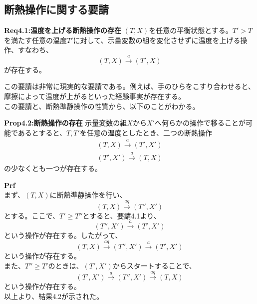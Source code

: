 \documentclass[a4paper,11pt]{jsarticle}
\begin{document}
\subsection{断熱操作に関する要請}
\begin{itembox}[l]{\textbf{Req4.1:温度を上げる断熱操作の存在}}
    $(T,X)$を任意の平衡状態とする。$T'>T$を満たす任意の温度$T'$に対して、示量変数の組を変化させずに温度を上げる操作、すなわち、
    \begin{equation}
        (T,X) \xrightarrow{a} (T',X)
    \end{equation}
    が存在する。
\end{itembox}
この要請は非常に現実的な要請である。例えば、手のひらをこすり合わせると、摩擦によって温度が上がるといった経験事実が存在する。\\
この要請と、断熱準静操作の性質から、以下のことがわかる。\\
\begin{itembox}[l]{\textbf{Prop4.2:断熱操作の存在}}
    示量変数の組$X$から$X'$へ何らかの操作で移ることが可能であるとすると、$T,T'$を任意の温度としたとき、二つの断熱操作
    \begin{align}
        (T,X) \xrightarrow{a} (T',X')\\
        (T',X') \xrightarrow{a} (T,X)
    \end{align}
    の少なくとも一つが存在する。
\end{itembox}
\textbf{Prf}\\
まず、$(T,X)$に断熱準静操作を行い、
\begin{equation}
    (T,X) \xrightarrow{aq} (T'',X')
\end{equation}
とする。ここで、$T'\geq T''$とすると、要請4.1より、
\begin{equation}
    (T'',X') \xrightarrow{a} (T',X')
\end{equation}
という操作が存在する。したがって、
\begin{equation}
    (T,X) \xrightarrow{aq} (T'',X') \xrightarrow{a} (T',X')
\end{equation}
という操作が存在する。\\
また、$T''\geq T'$のときは、$(T',X') $からスタートすることで、
\begin{equation}
    (T',X') \xrightarrow{a} (T'',X') \xrightarrow{aq} (T,X)
\end{equation}
という操作が存在する。\\
以上より、結果4.2が示された。\\
\end{document}
